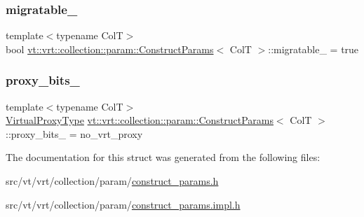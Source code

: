 \subsubsection{\texorpdfstring{migratable\+\_\+}{migratable\_}}
{\footnotesize\ttfamily template$<$typename ColT$>$ \\
bool \hyperlink{structvt_1_1vrt_1_1collection_1_1param_1_1_construct_params}{vt\+::vrt\+::collection\+::param\+::\+Construct\+Params}$<$ ColT $>$\+::migratable\+\_\+ = true\hspace{0.3cm}{\ttfamily [private]}}

\mbox{\label{structvt_1_1vrt_1_1collection_1_1param_1_1_construct_params_a459e1541fd22e637a616ca1f1f899124}} 
\subsubsection{\texorpdfstring{proxy\+\_\+bits\+\_\+}{proxy\_bits\_}}
{\footnotesize\ttfamily template$<$typename ColT$>$ \\
\hyperlink{namespacevt_a1b417dd5d684f045bb58a0ede70045ac}{Virtual\+Proxy\+Type} \hyperlink{structvt_1_1vrt_1_1collection_1_1param_1_1_construct_params}{vt\+::vrt\+::collection\+::param\+::\+Construct\+Params}$<$ ColT $>$\+::proxy\+\_\+bits\+\_\+ = no\+\_\+vrt\+\_\+proxy\hspace{0.3cm}{\ttfamily [private]}}



The documentation for this struct was generated from the following files\+:\begin{DoxyCompactItemize}
\item 
src/vt/vrt/collection/param/\hyperlink{construct__params_8h}{construct\+\_\+params.\+h}\item 
src/vt/vrt/collection/param/\hyperlink{construct__params_8impl_8h}{construct\+\_\+params.\+impl.\+h}\end{DoxyCompactItemize}

